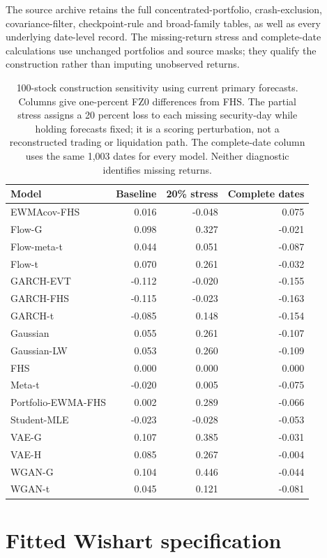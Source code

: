 \documentclass[11pt]{article}
\theoremstyle{definition}\newtheorem{definition}[theorem]{Definition}
\theoremstyle{remark}\newtheorem{remark}[theorem]{Remark}
\begin{document}
The source archive retains the full concentrated-portfolio, crash-exclusion, covariance-filter, checkpoint-rule and broad-family tables, as well as every underlying date-level record. The missing-return stress and complete-date calculations use unchanged portfolios and source masks; they qualify the construction rather than imputing unobserved returns.
\begin{table}[htbp]
\centering\footnotesize
\setlength{\tabcolsep}{4pt}
\begin{tabular}{lrrr}
\toprule
Model & Baseline & 20\% stress & Complete dates \\
\midrule
EWMAcov-FHS & 0.016 & -0.048 & 0.075 \\
Flow-G & 0.098 & 0.327 & -0.021 \\
Flow-meta-t & 0.044 & 0.051 & -0.087 \\
Flow-t & 0.070 & 0.261 & -0.032 \\
GARCH-EVT & -0.112 & -0.020 & -0.155 \\
GARCH-FHS & -0.115 & -0.023 & -0.163 \\
GARCH-t & -0.085 & 0.148 & -0.154 \\
Gaussian & 0.055 & 0.261 & -0.107 \\
Gaussian-LW & 0.053 & 0.260 & -0.109 \\
FHS & 0.000 & 0.000 & 0.000 \\
Meta-t & -0.020 & 0.005 & -0.075 \\
Portfolio-EWMA-FHS & 0.002 & 0.289 & -0.066 \\
Student-MLE & -0.023 & -0.028 & -0.053 \\
VAE-G & 0.107 & 0.385 & -0.031 \\
VAE-H & 0.085 & 0.267 & -0.004 \\
WGAN-G & 0.104 & 0.446 & -0.044 \\
WGAN-t & 0.045 & 0.121 & -0.081 \\
\bottomrule
\end{tabular}
\caption{100-stock construction sensitivity using current primary forecasts. Columns give one-percent FZ0 differences from FHS. The partial stress assigns a 20 percent loss to each missing security-day while holding forecasts fixed; it is a scoring perturbation, not a reconstructed trading or liquidation path. The complete-date column uses the same 1,003 dates for every model. Neither diagnostic identifies missing returns.}\label{tab:missing100}
\end{table}

\FloatBarrier
\section{Fitted Wishart specification}\label{sec:wishart-fit-details}
\end{document}
